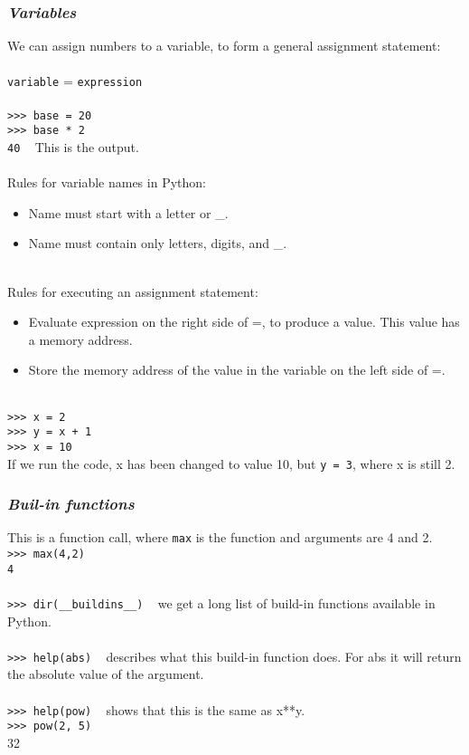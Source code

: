 \documentclass{article}
\begin{document}
{{{\subsubsection{\small\textsl{Variables}}
We can assign numbers to a variable, to form a general assignment statement:\\
\\
\texttt{variable} = \texttt{expression}\\
\\
\texttt{>>> base = 20} \\
\texttt{>>> base * 2}\\
\texttt{40} ~ This is the output.\\
\\
Rules for variable names in Python:
\begin{itemize}
\item Name must start with a letter or \_.
\item Name must contain only letters, digits, and \_.
\end{itemize}
\\
Rules for executing an assignment statement:
\begin{itemize}
\item Evaluate expression on the right side of =, to produce a value. This value has a memory address.
\item Store the memory address of the value in the variable on the left side of =.
\end{itemize}
\\
\texttt{>>> x = 2}\\
\texttt{>>> y = x + 1}\\
\texttt{>>> x = 10}\\
If we run the code, x has been changed to value 10, but \texttt{y = 3}, where x is still 2. 

\subsubsection{\small\textsl{Buil-in functions}}
This is a function call, where \texttt{max} is the function and arguments are 4 and 2.\\
\texttt{>>> max(4,2)}\\
\texttt{4}\\
\\
\texttt{>>> dir(\_\_buildins\_\_)} ~ we get a long list of build-in functions available in Python.\\
\\
\texttt{>>> help(abs)} ~ describes what this build-in function does. For abs it will return the absolute value of the argument.\\
\\
\texttt{>>> help(pow)} ~ shows that this is the same as x**y.\\
\texttt{>>> pow(2, 5)}\\
32\\

}}}
\end{document}
